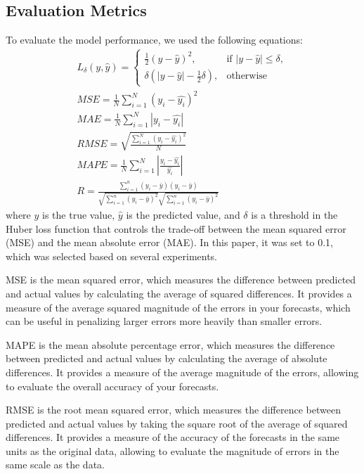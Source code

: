 \subsection{Evaluation Metrics}
\label{eval_appendix}
To evaluate the model performance, we used the following equations:
\begin{subequations}
\begin{gather}
    L_\delta (y, \hat{y}) = 
    \begin{cases}
    \frac{1}{2} (y - \hat{y})^2, & \text{if } |y - \hat{y}| \leq \delta,\\
    \delta (|y - \hat{y}| - \frac{1}{2} \delta), & \text{otherwise}
    \label{eq_huber}
    \end{cases}
    \\
    MSE = \frac{1}{N} \sum_{i=1}^{N} (y_i - \hat{y_i})^2\\ 
    MAE = \frac{1}{N} \sum_{i=1}^{N} |y_i - \hat{y_i}|\\ 
    RMSE = \sqrt{\frac{\sum_{i=1}^{N}(y_i - \hat{y_i})^2}{N}}\\ 
    MAPE = \frac{1}{N} \sum_{i=1}^{N} |\frac{y_i - \hat{y_i}}{\hat{y_i}}|\\ 
    R = \frac{\sum_{i=1}^n (y_i - \bar{y}) (y_i - \bar{y})}{\sqrt{\sum_{i=1}^n (y_i - \bar{y})^2} \sqrt{\sum_{i=1}^n (y_i - \bar{y})^2}}
\end{gather}
\label{eq_metrics}
\end{subequations}
where $y$ is the true value, $\hat{y}$ is the predicted value, and $\delta$ is a threshold in the Huber loss function that controls the trade-off between the mean squared error (MSE) and the mean absolute error (MAE). In this paper, it was set to 0.1, which was selected based on several experiments.

MSE is the mean squared error, which measures the difference between predicted and actual values by calculating the average of squared differences. It provides a measure of the average squared magnitude of the errors in your forecasts, which can be useful in penalizing larger errors more heavily than smaller errors. 

MAPE is the mean absolute percentage error, which measures the difference between predicted and actual values by calculating the average of absolute differences. It provides a measure of the average magnitude of the errors, allowing to evaluate the overall accuracy of your forecasts. 

RMSE is the root mean squared error, which measures the difference between predicted and actual values by taking the square root of the average of squared differences. It provides a measure of the accuracy of the forecasts in the same units as the original data, allowing to evaluate the magnitude of errors in the same scale as the data. 

